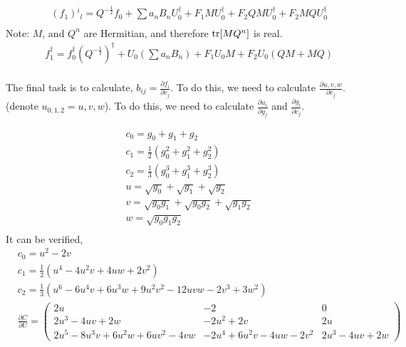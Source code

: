 \begin{equation}
\begin{split}
&(f_1){}^i{}_l=Q^{-\frac{1}{2}}f_0 + \sum a_n B_nU_0^{\dagger} + F_1 M U_0^{\dagger} + F_2 Q M U_0^{\dagger} + F_2 M Q U_0^{\dagger}\\
\end{split}
\end{equation}
Note: $M$, and $Q^n$ are Hermitian, and therefore ${\rm tr}[MQ^n]$ is real.
\begin{equation}
\begin{split}
&f_1^{\dagger}=f_0^{\dagger}(Q^{-\frac{1}{2}})^{\dagger} + U_0(\sum a_n B_n) + F_1 U_0M + F_2 U_0(QM+MQ)\\
\end{split}
\end{equation}

The final task is to calculate, $b_{ij}=\frac{\partial f_i}{\partial c_j}$.
To do this, we need to calculate $\frac{\partial u,v,w}{\partial c_j}$. (denote $u_{0,1,2}=u,v,w$).
To do this, we need to calculate $\frac{\partial u_i}{\partial g_j}$ and $\frac{\partial g_i}{\partial c_j}$.

\begin{equation}
\begin{split}
&c_0=g_0+g_1+g_2\\
&c_1=\frac{1}{2}(g_0^2+g_1^2+g_2^2)\\
&c_2=\frac{1}{3}(g_0^3+g_1^3+g_2^3)\\
&u=\sqrt{g_0}+\sqrt{g_1}+\sqrt{g_2}\\
&v=\sqrt{g_0g_1}+\sqrt{g_0g_2}+\sqrt{g_1g_2}\\
&w=\sqrt{g_0g_1g_2}\\
\end{split}
\end{equation}
It can be verified,
\begin{equation}
\begin{split}
&c_0=u^2-2v\\
&c_1=\frac{1}{2}(u^4-4u^2v+4uw+2v^2)\\
&c_2=\frac{1}{3}(u^6-6u^4v+6u^3w+9u^2v^2-12uvw-2v^3+3w^2)\\
&\frac{\partial C}{\partial U} = \begin{pmatrix}
    2u & -2 & 0\\
    2u^3-4uv+2w & -2u^2+2v & 2u \\
    2u^5-8u^3v+6u^2w+6uv^2-4vw & -2u^4+6u^2v-4uw-2v^2 & 2u^3-4uv +2w
\end{pmatrix}\\
\end{split}
\end{equation}

